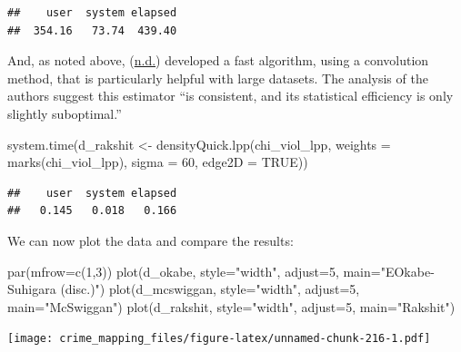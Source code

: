 \documentclass[
  krantz2]{krantz}
\makeatletter
\newenvironment{Shaded}{\begin{snugshade}}{\end{snugshade}}
\newcommand{\AttributeTok}[1]{\textcolor[rgb]{0.61,0.61,0.61}{#1}}
\newcommand{\ConstantTok}[1]{\textcolor[rgb]{0,0,0}{#1}}
\newcommand{\DecValTok}[1]{\textcolor[rgb]{0.06,0.06,0.06}{#1}}
\newcommand{\FunctionTok}[1]{\textcolor[rgb]{0,0,0}{#1}}
\newcommand{\NormalTok}[1]{#1}
\newcommand{\OtherTok}[1]{\textcolor[rgb]{0.37,0.37,0.37}{#1}}
\newcommand{\StringTok}[1]{\textcolor[rgb]{0.5,0.5,0.5}{#1}}
\newenvironment{kframe}{%
\medskip{}
\setlength{\fboxsep}{.8em}
 \def\at@end@of@kframe{}%
 \ifinner\ifhmode%
  \def\at@end@of@kframe{\end{minipage}}%
  \begin{minipage}{\columnwidth}%
 \fi\fi%
 \def\FrameCommand##1{\hskip\@totalleftmargin \hskip-\fboxsep
 \colorbox{shadecolor}{##1}\hskip-\fboxsep
     \hskip-\linewidth \hskip-\@totalleftmargin \hskip\columnwidth}%
 \MakeFramed {\advance\hsize-\width
   \@totalleftmargin\z@ \linewidth\hsize
   \@setminipage}}%
 {\par\unskip\endMakeFramed%
 \at@end@of@kframe}
\renewenvironment{Shaded}{\begin{kframe}}{\end{kframe}}
\makeatother
\begin{document}
\begin{verbatim}
##    user  system elapsed 
##  354.16   73.74  439.40
\end{verbatim}

And, as noted above, (\protect\hyperlink{ref-Rakshit_2019}{n.d.}) developed a fast algorithm, using a convolution method, that is particularly helpful with large datasets. The analysis of the authors suggest this estimator ``is consistent, and its statistical efficiency is only slightly suboptimal.''

\begin{Shaded}
\begin{Highlighting}[]
\FunctionTok{system.time}\NormalTok{(d\_rakshit }\OtherTok{\textless{}{-}} \FunctionTok{densityQuick.lpp}\NormalTok{(chi\_viol\_lpp, }
                                    \AttributeTok{weights =} \FunctionTok{marks}\NormalTok{(chi\_viol\_lpp), }
                                    \AttributeTok{sigma =} \DecValTok{60}\NormalTok{,}
                                    \AttributeTok{edge2D =} \ConstantTok{TRUE}\NormalTok{))}
\end{Highlighting}
\end{Shaded}

\begin{verbatim}
##    user  system elapsed 
##   0.145   0.018   0.166
\end{verbatim}

We can now plot the data and compare the results:

\begin{Shaded}
\begin{Highlighting}[]
\FunctionTok{par}\NormalTok{(}\AttributeTok{mfrow=}\FunctionTok{c}\NormalTok{(}\DecValTok{1}\NormalTok{,}\DecValTok{3}\NormalTok{))}
\FunctionTok{plot}\NormalTok{(d\_okabe, }\AttributeTok{style=}\StringTok{"width"}\NormalTok{, }\AttributeTok{adjust=}\DecValTok{5}\NormalTok{, }\AttributeTok{main=}\StringTok{"EOkabe{-}Suhigara (disc.)"}\NormalTok{)}
\FunctionTok{plot}\NormalTok{(d\_mcswiggan, }\AttributeTok{style=}\StringTok{"width"}\NormalTok{, }\AttributeTok{adjust=}\DecValTok{5}\NormalTok{, }\AttributeTok{main=}\StringTok{"McSwiggan"}\NormalTok{)}
\FunctionTok{plot}\NormalTok{(d\_rakshit, }\AttributeTok{style=}\StringTok{"width"}\NormalTok{, }\AttributeTok{adjust=}\DecValTok{5}\NormalTok{, }\AttributeTok{main=}\StringTok{"Rakshit"}\NormalTok{)}
\end{Highlighting}
\end{Shaded}

\texttt{[image: crime\_mapping\_files/figure-latex/unnamed-chunk-216-1.pdf]}
\end{document}
